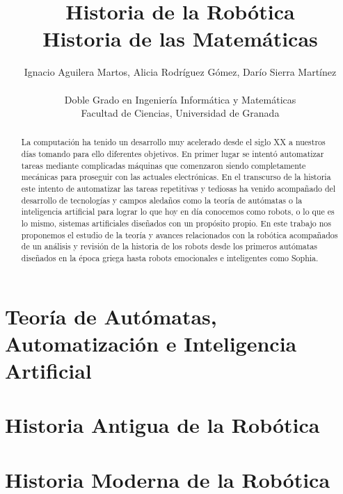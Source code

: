 \documentclass[a4paper,10pt]{article}
\begin{document}
	
\title{\textbf{Historia de la Robótica} \\
		\small{Historia de las Matemáticas}}
\date{}
\author{Ignacio Aguilera Martos, Alicia Rodríguez Gómez, Darío Sierra Martínez\\ \\
	\small Doble Grado en Ingeniería Informática y Matemáticas\\
	\small Facultad de Ciencias, Universidad de Granada
} 
	
\maketitle

\begin{abstract}
	La computación ha tenido un desarrollo muy acelerado desde el siglo XX a nuestros días tomando para ello diferentes objetivos. En primer lugar se intentó automatizar tareas mediante complicadas máquinas que comenzaron siendo completamente mecánicas para proseguir con las actuales electrónicas. En el transcurso de la historia este intento de automatizar las tareas repetitivas y tediosas ha venido acompañado del desarrollo de tecnologías y campos aledaños como la teoría de autómatas o la inteligencia artificial para lograr lo que hoy en día conocemos como robots, o lo que es lo mismo, sistemas artificiales diseñados con un propósito propio. En este trabajo nos proponemos el estudio de la teoría y avances relacionados con la robótica acompañados de un análisis y revisión de la historia de los robots desde los primeros autómatas diseñados en la época griega hasta robots emocionales e inteligentes como Sophia.
\end{abstract}

\newpage

\tableofcontents

\newpage

\section{Teoría de Autómatas, Automatización e Inteligencia Artificial}

\section{Historia Antigua de la Robótica}

\section{Historia Moderna de la Robótica}


\normalsize

% 
	
\onecolumn
\begin{thebibliography}{11}
	
	
\end{thebibliography}	
	
	
\end{document}
